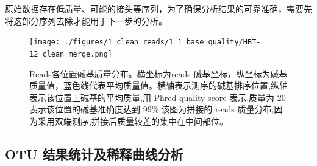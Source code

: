 \documentclass[a4paper,10pt]{article}
\numberwithin{figure}{section}
\numberwithin{table}{section}
\begin{document}
原始数据存在低质量、可能的接头等序列，为了确保分析结果的可靠准确，需要先将这部分序列去除才能用于下一步的分析。


\begin{figure}[H]
\centering 
\captionsetup{width=.7\textwidth,singlelinecheck = false, justification=justified}
\label{Fig:Position_In_Reads}
 \texttt{[image: ./figures/1\_clean\_reads/1\_1\_base\_quality/HBT-12\_clean\_merge.png]}  
 \caption{Reads各位置碱基质量分布。横坐标为reads 碱基坐标，纵坐标为碱基质量值，蓝色线代表平均质量值。横轴表示测序的碱基排序位置,纵轴表示该位置上碱基的平均质量,用 Phred quality
score 表示,质量为 20 表示该位置的碱基准确度达到 99\%,该图为拼接的 reads 质量分布,因为采用双端测序,拼接后质量较差的集中在中间部位。}
\end{figure}
\newpage
\subsection{OTU 结果统计及稀释曲线分析}
\label{Subsec:OTUAnnotation}
\end{document}
